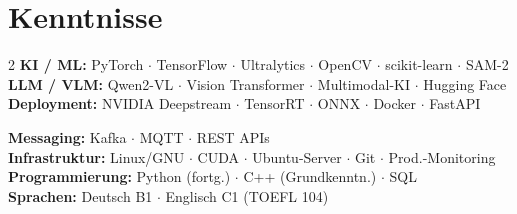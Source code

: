 \documentclass[10pt,a4paper]{article}
\begin{document}
\section{Kenntnisse}
\begin{multicols}{2}
\small\noindent
{\color{accent}\bfseries KI / ML:} PyTorch $\cdot$ TensorFlow $\cdot$ Ultralytics $\cdot$ OpenCV $\cdot$ scikit-learn $\cdot$ SAM-2\\[1pt]
{\color{accent}\bfseries LLM / VLM:} Qwen2-VL $\cdot$ Vision Transformer $\cdot$ Multimodal-KI $\cdot$ Hugging Face\\[1pt]
{\color{accent}\bfseries Deployment:} NVIDIA Deepstream $\cdot$ TensorRT $\cdot$ ONNX $\cdot$ Docker $\cdot$ FastAPI

\columnbreak
{\color{accent}\bfseries Messaging:} Kafka $\cdot$ MQTT $\cdot$ REST APIs\\[1pt]
{\color{accent}\bfseries Infrastruktur:} Linux/GNU $\cdot$ CUDA $\cdot$ Ubuntu-Server $\cdot$ Git $\cdot$ Prod.-Monitoring\\[1pt]
{\color{accent}\bfseries Programmierung:} Python (fortg.) $\cdot$ C++ (Grundkenntn.) $\cdot$ SQL\\[1pt]
{\color{accent}\bfseries Sprachen:} Deutsch B1 $\cdot$ Englisch C1 (TOEFL 104)
\end{multicols}
\end{document}
